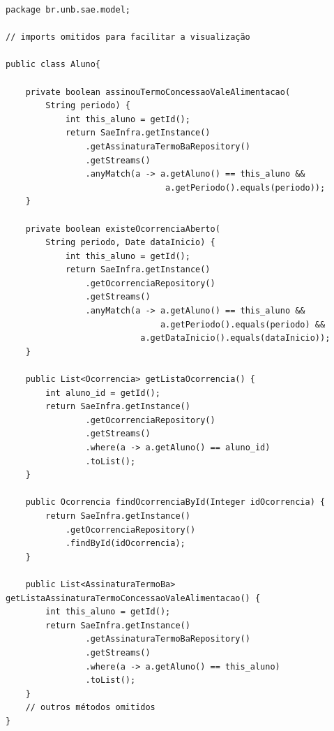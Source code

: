 \renewcommand{\lstlistingname}{Código}             
\begin{lstlisting}[caption=Exemplo de uso do método getStream() dos repositórios para consulta., label=fig:exemplo_get_stream]
package br.unb.sae.model;

// imports omitidos para facilitar a visualização

public class Aluno{

	private boolean assinouTermoConcessaoValeAlimentacao(
		String periodo) {
			int this_aluno = getId();
			return SaeInfra.getInstance()
				.getAssinaturaTermoBaRepository()
				.getStreams()
				.anyMatch(a -> a.getAluno() == this_aluno &&
							    a.getPeriodo().equals(periodo));
	}

	private boolean existeOcorrenciaAberto(
		String periodo, Date dataInicio) {
			int this_aluno = getId();
			return SaeInfra.getInstance()
				.getOcorrenciaRepository()
				.getStreams()
				.anyMatch(a -> a.getAluno() == this_aluno &&
							   a.getPeriodo().equals(periodo) &&
					       a.getDataInicio().equals(dataInicio));
	}

	public List<Ocorrencia> getListaOcorrencia() {
		int aluno_id = getId();
		return SaeInfra.getInstance()
				.getOcorrenciaRepository()
				.getStreams()
				.where(a -> a.getAluno() == aluno_id)
				.toList();
	}    
	
	public Ocorrencia findOcorrenciaById(Integer idOcorrencia) {
		return SaeInfra.getInstance()
			.getOcorrenciaRepository()
			.findById(idOcorrencia);
	}
	
	public List<AssinaturaTermoBa> getListaAssinaturaTermoConcessaoValeAlimentacao() {
		int this_aluno = getId();
		return SaeInfra.getInstance()
				.getAssinaturaTermoBaRepository()
				.getStreams()
				.where(a -> a.getAluno() == this_aluno)
				.toList();
	}
	// outros métodos omitidos
}
\end{lstlisting}





